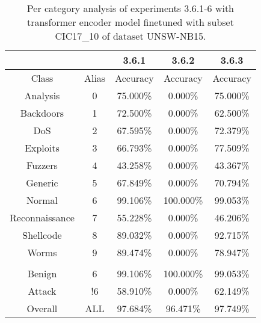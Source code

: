 \begin{table}[htb]
    \centering
    \begin{tabular}{@{}ccccc@{}}
        \toprule
         &  & 3.6.1 & 3.6.2 & 3.6.3 \\
        \midrule
        Class &  Alias &  Accuracy &  Accuracy &  Accuracy \\
        Analysis &  0 &  75.000\% &  0.000\% &  75.000\% \\
        Backdoors &  1 &  72.500\% &  0.000\% &  62.500\% \\
        DoS &  2 &  67.595\% &  0.000\% &  72.379\% \\
        Exploits &  3 &  66.793\% &  0.000\% &  77.509\% \\
        Fuzzers &  4 &  43.258\% &  0.000\% &  43.367\% \\
        Generic &  5 &  67.849\% &  0.000\% &  70.794\% \\
        Normal &  6 &  99.106\% &  100.000\% &  99.053\% \\
        Reconnaissance &  7 &  55.228\% &  0.000\% &  46.206\% \\
        Shellcode &  8 &  89.032\% &  0.000\% &  92.715\% \\
        Worms &  9 &  89.474\% &  0.000\% &  78.947\% \\
         \\
        Benign &  6 &  99.106\% &  100.000\% &  99.053\% \\
        Attack &  !6 &  58.910\% &  0.000\% &  62.149\% \\
        Overall &  ALL &  97.684\% &  96.471\% &  97.749\% \\
        \bottomrule
    \end{tabular}
    \caption{Per category analysis of experiments 3.6.1-6 with transformer encoder model finetuned with subset CIC17\_10 of dataset UNSW-NB15.}
    \label{table:results:lstm:class_flows15_subset}
\end{table}